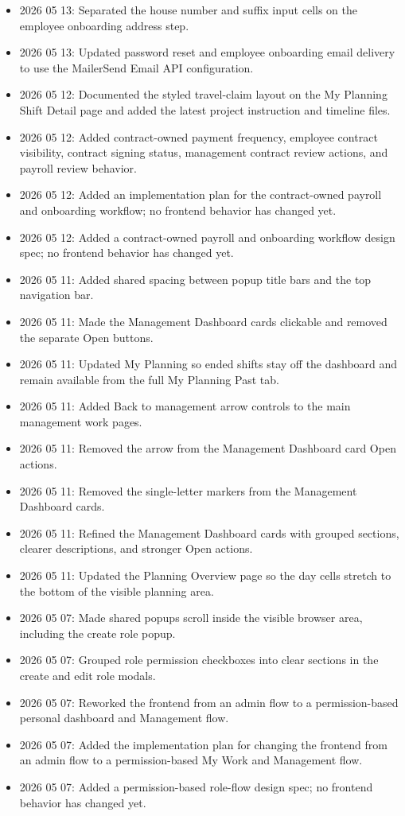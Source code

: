 \documentclass[11pt]{article}
\begin{document}
\begin{itemize}
    \item 2026 05 13: Separated the house number and suffix input cells on the employee onboarding address step.
    \item 2026 05 13: Updated password reset and employee onboarding email delivery to use the MailerSend Email API configuration.
    \item 2026 05 12: Documented the styled travel-claim layout on the My Planning Shift Detail page and added the latest project instruction and timeline files.
    \item 2026 05 12: Added contract-owned payment frequency, employee contract visibility, contract signing status, management contract review actions, and payroll review behavior.
    \item 2026 05 12: Added an implementation plan for the contract-owned payroll and onboarding workflow; no frontend behavior has changed yet.
    \item 2026 05 12: Added a contract-owned payroll and onboarding workflow design spec; no frontend behavior has changed yet.
    \item 2026 05 11: Added shared spacing between popup title bars and the top navigation bar.
    \item 2026 05 11: Made the Management Dashboard cards clickable and removed the separate Open buttons.
    \item 2026 05 11: Updated My Planning so ended shifts stay off the dashboard and remain available from the full My Planning Past tab.
    \item 2026 05 11: Added Back to management arrow controls to the main management work pages.
    \item 2026 05 11: Removed the arrow from the Management Dashboard card Open actions.
    \item 2026 05 11: Removed the single-letter markers from the Management Dashboard cards.
    \item 2026 05 11: Refined the Management Dashboard cards with grouped sections, clearer descriptions, and stronger Open actions.
    \item 2026 05 11: Updated the Planning Overview page so the day cells stretch to the bottom of the visible planning area.
    \item 2026 05 07: Made shared popups scroll inside the visible browser area, including the create role popup.
    \item 2026 05 07: Grouped role permission checkboxes into clear sections in the create and edit role modals.
    \item 2026 05 07: Reworked the frontend from an admin flow to a permission-based personal dashboard and Management flow.
    \item 2026 05 07: Added the implementation plan for changing the frontend from an admin flow to a permission-based My Work and Management flow.
    \item 2026 05 07: Added a permission-based role-flow design spec; no frontend behavior has changed yet.
\end{itemize}
\end{document}
